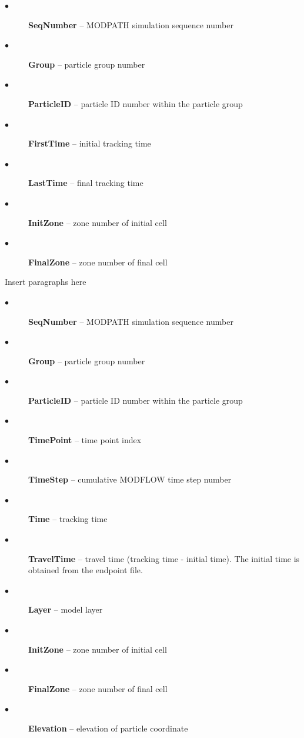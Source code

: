 \documentclass[11pt,twoside,twocolumn]{usgsreport}
\begin{document}
\begin{description}
  \item[$\bullet$ ] \textbf{SeqNumber} -- MODPATH simulation sequence number
  \item[$\bullet$ ] \textbf{Group} -- particle group number
  \item[$\bullet$ ] \textbf{ParticleID} -- particle ID number within the particle group
  \item[$\bullet$ ] \textbf{FirstTime} -- initial tracking time
  \item[$\bullet$ ] \textbf{LastTime} -- final tracking time
  \item[$\bullet$ ] \textbf{InitZone} -- zone number of initial cell
  \item[$\bullet$ ] \textbf{FinalZone} -- zone number of final cell
\end{description}

Insert paragraphs here

\begin{description}
  \item[$\bullet$ ] \textbf{SeqNumber} -- MODPATH simulation sequence number
  \item[$\bullet$ ] \textbf{Group} -- particle group number
  \item[$\bullet$ ] \textbf{ParticleID} -- particle ID number within the particle group
  \item[$\bullet$ ] \textbf{TimePoint} -- time point index
  \item[$\bullet$ ] \textbf{TimeStep} -- cumulative MODFLOW time step number
  \item[$\bullet$ ] \textbf{Time} -- tracking time
  \item[$\bullet$ ] \textbf{TravelTime} -- travel time (tracking time - initial time). The initial time is obtained from the endpoint file.
  \item[$\bullet$ ] \textbf{Layer} -- model layer
  \item[$\bullet$ ] \textbf{InitZone} -- zone number of initial cell
  \item[$\bullet$ ] \textbf{FinalZone} -- zone number of final cell
  \item[$\bullet$ ] \textbf{Elevation} -- elevation of particle coordinate
\end{description}

\vspace*{\fill}
\clearpage
\pagestyle{backofreport}
\makebackcover
\end{document}
